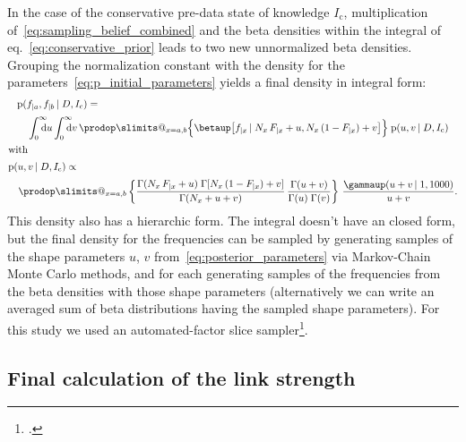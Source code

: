 \documentclass[\ifafour a4paper,12pt,\else a5paper,10pt,\fi%
onecolumn,oneside,article,%
british%
]{memoir}
\makeatletter
\theoremstyle{remark}
\theoremstyle{innote}
\def\prod{\DOTSI\prodop\slimits@}
\newcommand*{\citep}{\footcites}
\newcommand*{\di}{\mathrm{d}}%
\newcommand*{\pf}{\mathrm{p}}%
\renewcommand*{\|}[1][]{\nonscript\,#1\vert\nonscript\;\mathopen{}}
\newcommand*{\eqn}{eq.}%
\newcommand*{\yD}{D}
\newcommand*{\yI}{I}
\newcommand*{\yIc}{\yI_\text{c}}
\newcommand*{\ya}{a}
\newcommand*{\yb}{b}
\newcommand*{\dbeta}{\betaup}
\newcommand*{\dgamma}{\gammaup}
\newcommand*{\yua}{u}
\newcommand*{\yub}{v}
\makeatother
\begin{document}
In the case of the conservative pre-data state of knowledge $\yIc$,
multiplication of~\eqref{eq:sampling_belief_combined} and the beta
densities within the integral of \eqn~\eqref{eq:conservative_prior} leads
to two new unnormalized beta densities. Grouping the normalization constant
with the density for the parameters~\eqref{eq:p_initial_parameters} yields
a final density in integral form:
\begin{subequations}
  \label{eq:final_from_conservative}
  \begin{gather}
  \begin{multlined}[t][\linewidth]
    \pf(f_{|\ya}, f_{|\yb} \| \yD, \yIc)
    ={}\\[\jot]
    \int_{\mathrlap{0}}^{\mathrlap{\infty}}\di\yua
    \int_{\mathrlap{0}}^{\mathrlap{\infty}}\di\yub\,
    \prod_{x=\ya,\yb}\Bigl\{ 
    \dbeta\bigl[f_{|x} \| N_{x}\,F_{|x} +\yua, N_{x}\,(1-F_{|x})+\yub\bigr]
    \Bigr\}\; \pf(\yua,\yub \| \yD,\yIc)
  \end{multlined}\\
  \shortintertext{with}
      \label{eq:posterior_parameters}
  \begin{multlined}[t][\linewidth]
    \pf(\yua,\yub \| \yD,\yIc) \propto{}\\[\jot]
    \prod_{x=\ya,\yb}\left\{
      \frac{\Gamma(N_{x}\,F_{|x}+\yua)\;\Gamma[N_{x}\,(1-F_{|x})+\yub]}
      {\Gamma(N_{x}+\yua+\yub)}\,
      \frac{\Gamma(\yua+\yub)}
      {\Gamma(\yua)\;\Gamma(\yub)} \right\}
    \,\frac{\dgamma(\yua+\yub \| 1, 1000)}{\yua+\yub}.
  \end{multlined}
\end{gather}
\end{subequations}
This density also has a hierarchic form. The integral doesn't have an
closed form, but the final density for the frequencies can be sampled by
generating samples of the shape parameters $\yua$, $\yub$
from~\eqref{eq:posterior_parameters} via Markov-Chain Monte Carlo methods,
and for each generating samples of the frequencies from the beta densities
with those shape parameters (alternatively we can write an averaged sum of
beta distributions having the sampled shape parameters). For this study we
used an automated-factor slice sampler\citep{hall2014}.

\subsection{Final calculation of the link strength}
\label{sec:calc_link}
\end{document}
